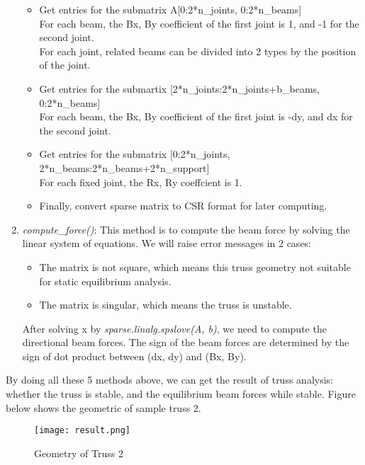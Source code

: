 \documentclass{article}
\begin{document}
\begin{enumerate}
\begin{itemize}
\item Get entries for the submatrix A[0:2*n\_joints, 0:2*n\_beams]\\
For each beam, the Bx, By coefficient of the first joint is 1, and -1 for the second joint.\\
For each joint, related beams can be divided into 2 types by the position of the joint.
\item Get entries for the submartix [2*n\_joints:2*n\_joints+b\_beams, 0:2*n\_beams]\\
For each beam, the Bx, By coefficient of the first joint is -dy, and dx for the second joint.
\item Get entries for the submatrix [0:2*n\_joints, 2*n\_beams:2*n\_beams+2*n\_support]\\
For each fixed joint, the Rx, Ry coeffcient is 1.
\item Finally, convert sparse matrix to CSR format for later computing.
\end{itemize}

\item \emph{compute\_force()}:
This method is to compute the beam force by solving the linear system of equations. We will raise error messages in 2 cases:
\begin{itemize}
\item The matrix is not square, which means this truss geometry not suitable for static equilibrium analysis.
\item The matrix is singular, which means the truss  is unstable.
\end{itemize}
After solving x by \emph{sparse.linalg.spslove(A, b)}, we need to compute the directional beam forces. The sign of the beam forces are determined by the sign of dot product between (dx, dy) and (Bx, By).
\end{enumerate}

By doing all these 5 methods above, we can get the result of truss analysis: whether the truss is stable, and the equilibrium beam forces while stable. Figure below shows the geometric of sample truss 2.
\begin{figure}[h]
\centering
\texttt{[image: result.png]}
\caption{Geometry of Truss 2}
\end{figure}
\end{document}
